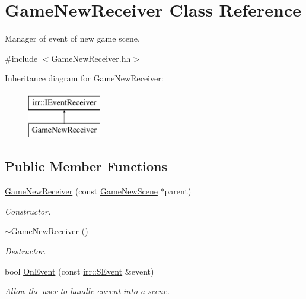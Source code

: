 \hypertarget{classGameNewReceiver}{}\section{Game\+New\+Receiver Class Reference}
\label{classGameNewReceiver}


Manager of event of new game scene.  




{\ttfamily \#include $<$Game\+New\+Receiver.\+hh$>$}

Inheritance diagram for Game\+New\+Receiver\+:\begin{figure}[H]
\begin{center}
\leavevmode
\includegraphics[height=2.000000cm]{classGameNewReceiver}
\end{center}
\end{figure}
\subsection*{Public Member Functions}
\begin{DoxyCompactItemize}
\item 
\hyperlink{classGameNewReceiver_a41816905e385ac8e17849d599106b930}{Game\+New\+Receiver} (const \hyperlink{classGameNewScene}{Game\+New\+Scene} $\ast$parent)
\begin{DoxyCompactList}\small\item\em Constructor. \end{DoxyCompactList}\item 
\hyperlink{classGameNewReceiver_ab92b6653b56d291853a4e2f737eaf6fd}{$\sim$\+Game\+New\+Receiver} ()
\begin{DoxyCompactList}\small\item\em Destructor. \end{DoxyCompactList}\item 
bool \hyperlink{classGameNewReceiver_ad9ec097d8b46946ed1a21c24463fc0b6}{On\+Event} (const \hyperlink{structirr_1_1SEvent}{irr\+::\+S\+Event} \&event)
\begin{DoxyCompactList}\small\item\em Allow the user to handle envent into a scene. \end{DoxyCompactList}\end{DoxyCompactItemize}


